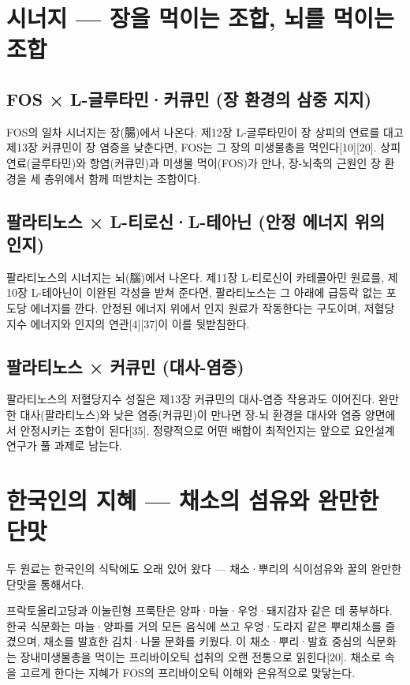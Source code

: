 \documentclass[12pt,oneside]{book}
\begin{document}
\section{시너지 — 장을 먹이는 조합, 뇌를 먹이는 조합}

\subsection{FOS × L-글루타민·커큐민 (장 환경의 삼중 지지)}

FOS의 일차 시너지는 장(腸)에서 나온다. 제12장 L-글루타민이 장 상피의 연료를 대고 제13장 커큐민이 장 염증을 낮춘다면, FOS는 그 장의 미생물총을 먹인다[10][20]. 상피 연료(글루타민)와 항염(커큐민)과 미생물 먹이(FOS)가 만나, 장-뇌축의 근원인 장 환경을 세 층위에서 함께 떠받치는 조합이다.

\subsection{팔라티노스 × L-티로신·L-테아닌 (안정 에너지 위의 인지)}

팔라티노스의 시너지는 뇌(腦)에서 나온다. 제11장 L-티로신이 카테콜아민 원료를, 제10장 L-테아닌이 이완된 각성을 받쳐 준다면, 팔라티노스는 그 아래에 급등락 없는 포도당 에너지를 깐다. 안정된 에너지 위에서 인지 원료가 작동한다는 구도이며, 저혈당지수 에너지와 인지의 연관[4][37]이 이를 뒷받침한다.

\subsection{팔라티노스 × 커큐민 (대사-염증)}

팔라티노스의 저혈당지수 성질은 제13장 커큐민의 대사-염증 작용과도 이어진다. 완만한 대사(팔라티노스)와 낮은 염증(커큐민)이 만나면 장-뇌 환경을 대사와 염증 양면에서 안정시키는 조합이 된다[35]. 정량적으로 어떤 배합이 최적인지는 앞으로 요인설계 연구가 풀 과제로 남는다.

\section{한국인의 지혜 — 채소의 섬유와 완만한 단맛}

두 원료는 한국인의 식탁에도 오래 있어 왔다 — 채소·뿌리의 식이섬유와 꿀의 완만한 단맛을 통해서다.

프락토올리고당과 이눌린형 프룩탄은 양파·마늘·우엉·돼지감자 같은 데 풍부하다. 한국 식문화는 마늘·양파를 거의 모든 음식에 쓰고 우엉·도라지 같은 뿌리채소를 즐겼으며, 채소를 발효한 김치·나물 문화를 키웠다. 이 채소·뿌리·발효 중심의 식문화는 장내미생물총을 먹이는 프리바이오틱 섭취의 오랜 전통으로 읽힌다[20]. 채소로 속을 고르게 한다는 지혜가 FOS의 프리바이오틱 이해와 은유적으로 맞닿는다.
\end{document}
